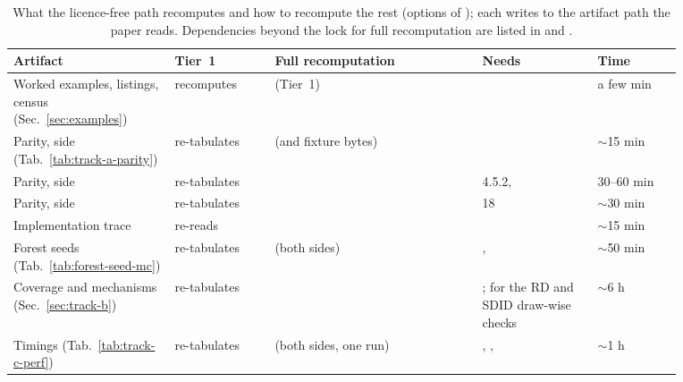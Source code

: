 \begin{table}[!ht]
\centering\scriptsize
\begin{tabular}{@{}L{0.21\linewidth}L{0.13\linewidth}L{0.27\linewidth}L{0.15\linewidth}L{0.11\linewidth}@{}}
\toprule
Artifact & Tier~1 & Full recomputation & Needs & Time \\
\midrule
Worked examples, listings, census (Sec.~\ref{sec:examples}) & recomputes &  (Tier~1) &  & a few min \\
Parity, \statspai{} side (Tab.~\ref{tab:track-a-parity}) & re-tabulates &  (and fixture bytes) &  & \(\sim\)15 min \\
Parity,  side & re-tabulates &  &  4.5.2,  & 30--60 min \\
Parity,  side & re-tabulates &  &  18 & \(\sim\)30 min \\
Implementation trace & re-reads &  &  & \(\sim\)15 min \\
Forest seeds (Tab.~\ref{tab:forest-seed-mc}) & re-tabulates &  (both sides) & ,  & \(\sim\)50 min \\
Coverage and mechanisms (Sec.~\ref{sec:track-b}) & re-tabulates &  & ;  for the RD and SDID draw-wise checks & \(\sim\)6 h \\
Timings (Tab.~\ref{tab:track-c-perf}) & re-tabulates &  (both sides, one run) & , ,  & \(\sim\)1 h \\
\bottomrule
\end{tabular}
\caption{What the licence-free path recomputes and how to recompute the
rest (options of ); each writes to the
artifact path the paper reads. Dependencies beyond the lock for full
recomputation are listed in  and
.}
\label{tab:reproduction}
\end{table}
